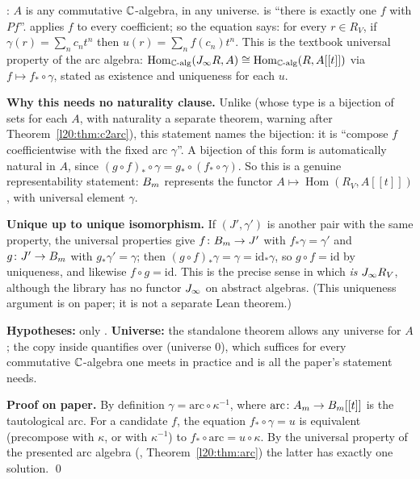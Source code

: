 \begin{dictionary}
: $A$ is any commutative ${\mathbb{C}}$-algebra, in any universe.  is
``there is exactly one $f$ with $P f$''.  applies $f$ to
every coefficient; so the equation says: for every $r\in R_V$, if $\gamma(r)=\sum_nc_nt^n$ then $u(r)=\sum_nf(c_n)t^n$. This
is the textbook universal property of the arc algebra: $\operatorname{Hom}_{{\mathbb{C}}\text{-alg}}(J_\infty R,A)\cong
\operatorname{Hom}_{{\mathbb{C}}\text{-alg}}(R,A[[t]])$ via $f\mapsto f_*\circ\gamma$, stated as existence and uniqueness for each $u$.

\textbf{Why this needs no naturality clause.} Unlike  (whose type is a bijection of sets for each
$A$, with naturality a separate theorem, warning after Theorem~\ref{l20:thm:c2arc}), this statement names the bijection: it is ``compose $f$ coefficientwise with the
fixed arc $\gamma$''. A bijection of this form is automatically natural in $A$, since $(g\circ f)_*\circ\gamma=g_*\circ(f_*\circ\gamma)$.
So this is a genuine representability statement: $B_m$ represents the functor $A\mapsto\operatorname{Hom}(R_V,A[[t]])$,
with universal element $\gamma$.

\textbf{Unique up to unique isomorphism.} If $(J',\gamma')$ is another pair with the same property, the universal properties
give $f\colon B_m\to J'$ with $f_*\gamma=\gamma'$ and $g\colon J'\to B_m$ with $g_*\gamma'=\gamma$; then
$(g\circ f)_*\gamma=\gamma=\mathrm{id}_*\gamma$, so $g\circ f=\mathrm{id}$ by uniqueness, and likewise $f\circ g=\mathrm{id}$. This
is the precise sense in which  \emph{is} $J_\infty R_V$, although the library has no functor
$J_\infty$ on abstract algebras. (This uniqueness argument is on paper; it is not a separate Lean theorem.)

\textbf{Hypotheses:} only . \textbf{Universe:} the standalone theorem allows any universe for $A$; the copy inside
 quantifies over  (universe $0$), which suffices for every commutative
${\mathbb{C}}$-algebra one meets in practice and is all the paper's statement needs.
\end{dictionary}

\textbf{Proof on paper.} By definition $\gamma=\mathrm{arc}\circ\kappa^{-1}$, where $\mathrm{arc}\colon A_m\to B_m[[t]]$ is
the tautological arc. For a candidate $f$, the equation $f_*\circ\gamma=u$ is equivalent (precompose with $\kappa$, or with
$\kappa^{-1}$) to $f_*\circ\mathrm{arc}=u\circ\kappa$. By the universal property of the presented arc algebra
(, Theorem~\ref{l20:thm:arc}) the latter has exactly one solution. \qed

